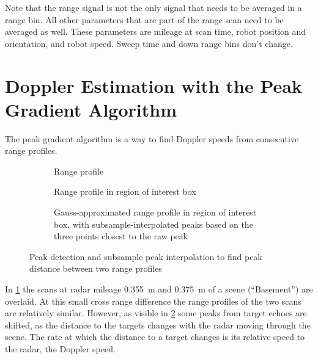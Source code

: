 Note that the range signal is not the only signal that needs to be
averaged in a range bin. All other parameters that are part of the range
scan need to be averaged as well. These parameters are mileage at scan
time, robot position and orientation, and robot speed. Sweep time and
down range bins don't change.

\section{Doppler Estimation with the Peak Gradient Algorithm} \label{doppler-estimation-with-the-peak-gradient-algorithm}

The peak gradient algorithm is a way to find Doppler speeds from
consecutive range profiles.

\begin{figure}[htbp]
    \centering
    \begin{subfigure}[t]{\textwidth}
        \def\svgwidth{\linewidth}
        
        \caption{Range profile}
        \label{fig:explain_peak_gradient_1}
    \end{subfigure}
    \begin{subfigure}[t]{\textwidth}
        \def\svgwidth{\linewidth}
        
        \caption{Range profile in region of interest box}
        \label{fig:explain_peak_gradient_2}
    \end{subfigure}
    \begin{subfigure}[t]{\textwidth}
        \def\svgwidth{\linewidth}
        
        \caption{Gauss-approximated range profile in region of interest box, with subsample-interpolated peaks based on the three points closest to the raw peak}
        \label{fig:explain_peak_gradient_3}
    \end{subfigure}\bigskip
    \caption{Peak detection and subsample peak interpolation to find peak distance between two range profiles}
    \label{fig:fig_explain_peak_gradient}
\end{figure}

In \cref{fig:explain_peak_gradient_1} the scans at radar mileage \SI{0.355}{m} and \SI{0.375}{m} of a scene (``Basement'') are overlaid. At this small cross range difference the range profiles of the two scans are relatively similar. However, as visible in \cref{fig:explain_peak_gradient_2} some peaks from target echoes are shifted, as the distance to the targets changes with the radar moving through the scene. The rate at which the distance to a target changes is its relative speed to the radar, the Doppler speed.

